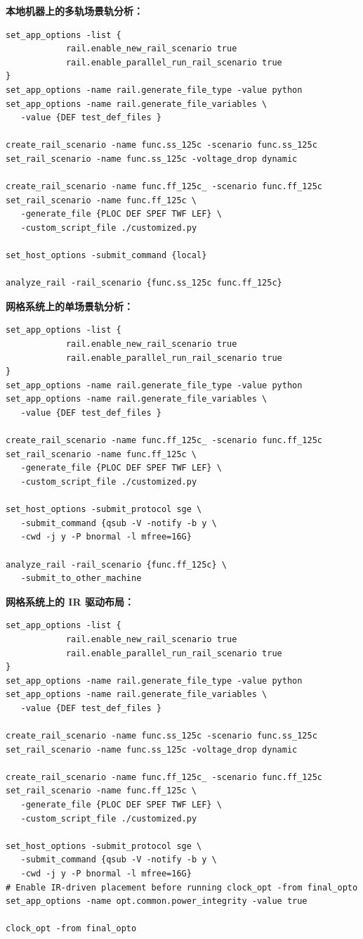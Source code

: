 \textbf{本地机器上的多轨场景轨分析：}
\begin{lstlisting}
set_app_options -list {
            rail.enable_new_rail_scenario true
            rail.enable_parallel_run_rail_scenario true
}
set_app_options -name rail.generate_file_type -value python
set_app_options -name rail.generate_file_variables \
   -value {DEF test_def_files }

create_rail_scenario -name func.ss_125c -scenario func.ss_125c
set_rail_scenario -name func.ss_125c -voltage_drop dynamic

create_rail_scenario -name func.ff_125c_ -scenario func.ff_125c
set_rail_scenario -name func.ff_125c \
   -generate_file {PLOC DEF SPEF TWF LEF} \
   -custom_script_file ./customized.py

set_host_options -submit_command {local}

analyze_rail -rail_scenario {func.ss_125c func.ff_125c}
\end{lstlisting}

\textbf{网格系统上的单场景轨分析：}
\begin{lstlisting}
set_app_options -list {
            rail.enable_new_rail_scenario true
            rail.enable_parallel_run_rail_scenario true
}
set_app_options -name rail.generate_file_type -value python
set_app_options -name rail.generate_file_variables \
   -value {DEF test_def_files }

create_rail_scenario -name func.ff_125c_ -scenario func.ff_125c
set_rail_scenario -name func.ff_125c \
   -generate_file {PLOC DEF SPEF TWF LEF} \
   -custom_script_file ./customized.py

set_host_options -submit_protocol sge \
   -submit_command {qsub -V -notify -b y \
   -cwd -j y -P bnormal -l mfree=16G}

analyze_rail -rail_scenario {func.ff_125c} \
   -submit_to_other_machine
\end{lstlisting}

\textbf{网格系统上的 IR 驱动布局：}
\begin{lstlisting}
set_app_options -list {
            rail.enable_new_rail_scenario true
            rail.enable_parallel_run_rail_scenario true
}
set_app_options -name rail.generate_file_type -value python
set_app_options -name rail.generate_file_variables \
   -value {DEF test_def_files }

create_rail_scenario -name func.ss_125c -scenario func.ss_125c
set_rail_scenario -name func.ss_125c -voltage_drop dynamic

create_rail_scenario -name func.ff_125c_ -scenario func.ff_125c
set_rail_scenario -name func.ff_125c \
   -generate_file {PLOC DEF SPEF TWF LEF} \
   -custom_script_file ./customized.py

set_host_options -submit_protocol sge \
   -submit_command {qsub -V -notify -b y \
   -cwd -j y -P bnormal -l mfree=16G}
# Enable IR-driven placement before running clock_opt -from final_opto
set_app_options -name opt.common.power_integrity -value true

clock_opt -from final_opto
\end{lstlisting}

